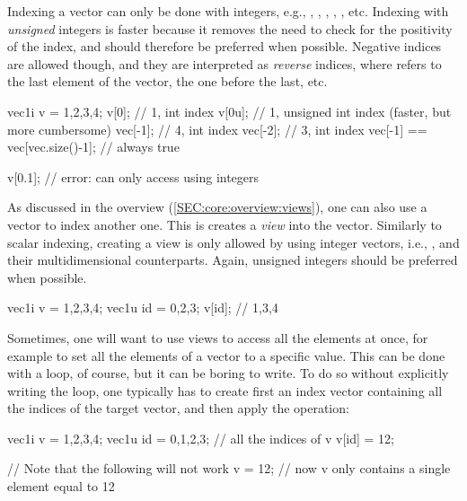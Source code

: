 \documentclass[12pt]{report}
\newenvironment{example}
{
    \begin{mdframed}[style=example,frametitle={Example}]
}
{
    \end{mdframed}
}
\begin{document}
Indexing a vector can only be done with integers, e.g., , , , , , etc. Indexing with \emph{unsigned} integers is faster because it removes the need to check for the positivity of the index, and should therefore be preferred when possible. Negative indices are allowed though, and they are interpreted as \emph{reverse} indices, where  refers to the last element of the vector,  the one before the last, etc.

\begin{example}
\begin{cppcode}
vec1i v = {1,2,3,4};
v[0];    // 1, int index
v[0u];   // 1, unsigned int index (faster, but more cumbersome)
vec[-1]; // 4, int index
vec[-2]; // 3, int index
vec[-1] == vec[vec.size()-1]; // always true

v[0.1]; // error: can only access using integers
\end{cppcode}
\end{example}

As discussed in the overview (\ref{SEC:core:overview:views}), one can also use a vector to index another one. This is creates a \emph{view} into the vector. Similarly to scalar indexing, creating a view is only allowed by using integer vectors, i.e., ,  and their multidimensional counterparts. Again, unsigned integers should be preferred when possible.

\begin{example}
\begin{cppcode}
vec1i v = {1,2,3,4};
vec1u id = {0,2,3};
v[id]; // 1,3,4
\end{cppcode}
\end{example}

Sometimes, one will want to use views to access all the elements at once, for example to set all the elements of a vector to a specific value. This can be done with a loop, of course, but it can be boring to write. To do so without explicitly writing the loop, one typically has to create first an index vector containing all the indices of the target vector, and then apply the operation:

\begin{cppcode}
vec1i v = {1,2,3,4};
vec1u id = {0,1,2,3}; // all the indices of v
v[id] = 12;

// Note that the following will not work
v = 12; // now v only contains a single element equal to 12
\end{cppcode}
\end{document}

